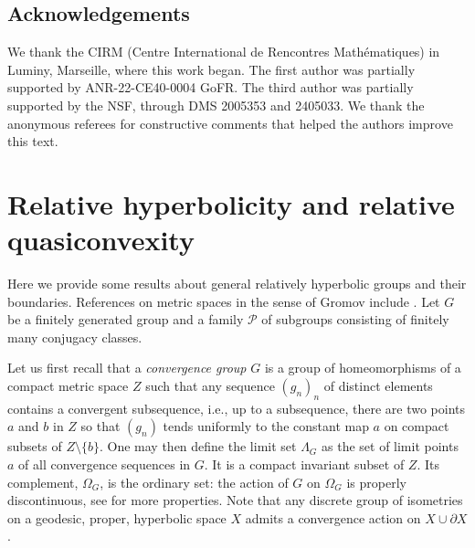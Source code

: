 \documentclass[11pt]{article}
\theoremstyle{definition}
\begin{document}
\subsection*{Acknowledgements} We thank the CIRM (Centre International de Rencontres Math\'ematiques) in Luminy, Marseille,  where this work began. The first author was partially supported by ANR-22-CE40-0004 GoFR. The third author was partially supported by the NSF, through DMS 2005353 and 2405033. We thank the anonymous referees for constructive comments that helped the authors improve this text.

\section{Relative hyperbolicity and relative quasiconvexity}
\label{sec:general} 
Here we provide some results about general relatively hyperbolic groups and their boundaries. References on metric spaces in the sense of Gromov include \cite{ghys:delaharpe:groupes, bridson:haefliger}.
Let $G$ be a finitely generated  group
and a family $\mathcal{P}$ of subgroups consisting of finitely many conjugacy classes. 

Let us first recall that a \emph{convergence group} $G$ is a group of homeomorphisms of a compact metric space $Z$ such that any sequence $(g_n)_n$ of distinct elements contains a convergent subsequence, i.e., up to a subsequence, there are  two points $a$ and $b$ in $Z$ so that $(g_n)$ tends uniformly to the constant map $a$ on compact subsets of $Z\setminus\{b\}$.
One may then define the limit set $\Lambda_G$ as the set of limit points $a$ of all convergence 
sequences in $G$. It is a compact invariant subset of $Z$. Its complement, $\Omega_G$, is the ordinary set: the action of $G$ on $\Omega_G$ is properly discontinuous, see \cite{GM1} for more properties. 
Note that any discrete group of isometries on a geodesic, proper, hyperbolic space $X$ admits a convergence action on $X\cup \partial X$. 
\end{document}
